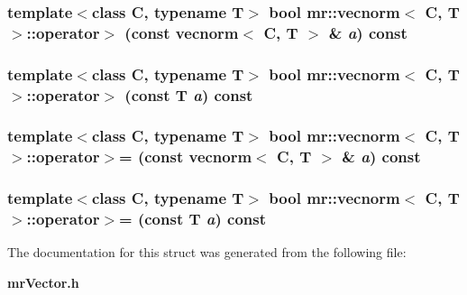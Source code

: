 \subsubsection{\setlength{\rightskip}{0pt plus 5cm}template$<$class C, typename T$>$ bool {\bf mr::vecnorm}$<$ C, T $>$::operator$>$ (const {\bf vecnorm}$<$ C, T $>$ \& {\em a}) const\hspace{0.3cm}{\tt  [inline]}}\label{structmr_1_1vecnorm_z57_5}


\subsubsection{\setlength{\rightskip}{0pt plus 5cm}template$<$class C, typename T$>$ bool {\bf mr::vecnorm}$<$ C, T $>$::operator$>$ (const T {\em a}) const\hspace{0.3cm}{\tt  [inline]}}\label{structmr_1_1vecnorm_z57_1}


\subsubsection{\setlength{\rightskip}{0pt plus 5cm}template$<$class C, typename T$>$ bool {\bf mr::vecnorm}$<$ C, T $>$::operator$>$= (const {\bf vecnorm}$<$ C, T $>$ \& {\em a}) const\hspace{0.3cm}{\tt  [inline]}}\label{structmr_1_1vecnorm_z57_7}


\subsubsection{\setlength{\rightskip}{0pt plus 5cm}template$<$class C, typename T$>$ bool {\bf mr::vecnorm}$<$ C, T $>$::operator$>$= (const T {\em a}) const\hspace{0.3cm}{\tt  [inline]}}\label{structmr_1_1vecnorm_z57_3}




The documentation for this struct was generated from the following file:\begin{CompactItemize}
\item 
{\bf mr\-Vector.h}\end{CompactItemize}
